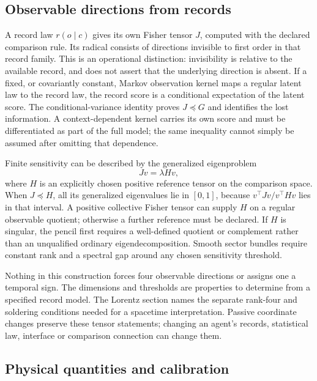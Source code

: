 \subsection{Observable directions from records}
\label{sec:observable_sectors}

A record law $r(o\mid c)$ gives its own Fisher tensor $J$, computed with the declared comparison rule. Its radical consists of directions invisible to first order in that record family. This is an operational distinction: invisibility is relative to the available record, and does not assert that the underlying direction is absent. If a fixed, or covariantly constant, Markov observation kernel maps a regular latent law to the record law, the record score is a conditional expectation of the latent score. The conditional-variance identity proves $J\preceq G$ and identifies the lost information. A context-dependent kernel carries its own score and must be differentiated as part of the full model; the same inequality cannot simply be assumed after omitting that dependence.

Finite sensitivity can be described by the generalized eigenproblem
\begin{equation}
Jv=\lambda Hv,
\label{eq:operational_sector_pencil}
\end{equation}
where $H$ is an explicitly chosen positive reference tensor on the comparison space. When $J\preceq H$, all its generalized eigenvalues lie in $[0,1]$, because $v^\top Jv/ v^\top Hv$ lies in that interval. A positive collective Fisher tensor can supply $H$ on a regular observable quotient; otherwise a further reference must be declared. If $H$ is singular, the pencil first requires a well-defined quotient or complement rather than an unqualified ordinary eigendecomposition. Smooth sector bundles require constant rank and a spectral gap around any chosen sensitivity threshold.

Nothing in this construction forces four observable directions or assigns one a temporal sign. The dimensions and thresholds are properties to determine from a specified record model. The Lorentz section names the separate rank-four and soldering conditions needed for a spacetime interpretation. Passive coordinate changes preserve these tensor statements; changing an agent's records, statistical law, interface or comparison connection can change them.

\subsection{Physical quantities and calibration}
\label{sec:phenomenological_interpretation}

